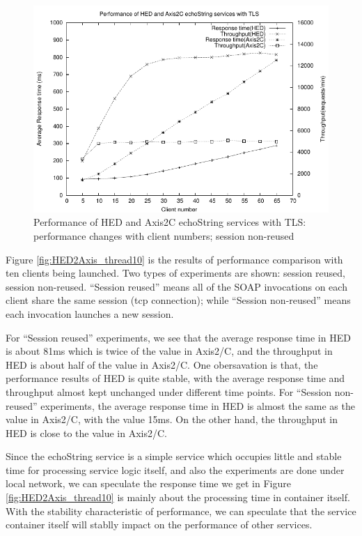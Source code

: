 \documentclass[conference]{IEEEtran}
\begin{document}
\begin{figure}
\includegraphics[width=0.9\columnwidth]{TLS_thread_all.pdf}
\caption{Performance of HED and Axis2C echoString services with TLS: performance
changes with client numbers; session non-reused}
\label{fig:TLS_thread_all}
\end{figure}

Figure \ref{fig:HED2Axis_thread10} is the results of performance comparison with ten 
clients being launched.
Two types of experiments are shown: session reused, session non-reused.
``Session reused'' means all of the SOAP invocations on each client share the same session 
(tcp connection); while ``Session non-reused'' means each invocation launches a new session.

For ``Session reused'' experiments, we see that the average response time in HED is about 81ms
which is twice of the value in Axis2/C, and the throughput in HED is about half of the value in Axis2/C. 
One obersavation is that, the performance results of HED is quite stable, with the average response time 
and throughput almost kept unchanged under different time points.
For ``Session non-reused'' experiments, the average response time in HED is almost the same as
the value in Axis2/C, with the value 15ms. On the other hand, the throughput in HED is close to
 the value in Axis2/C. 

Since the echoString service is a simple service which occupies little and stable time for processing
service logic itself, and also the experiments are done under local network, we can speculate 
the response time we get in Figure \ref{fig:HED2Axis_thread10} is mainly about the processing time 
in container itself.
With the stability characteristic of performance, we can speculate that the service container 
itself will stablly impact on the performance of other services.
\end{document}
